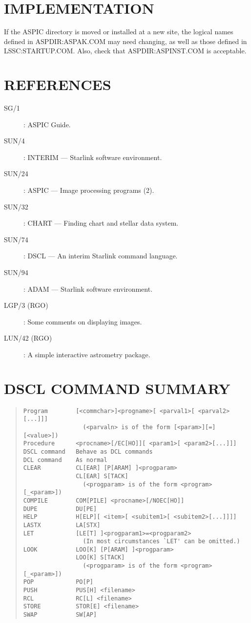 \section {IMPLEMENTATION}

If the ASPIC directory is moved or installed at a new site, the logical names
defined in ASPDIR:ASPAK.COM may need changing, as well as those defined in
LSSC:STARTUP.COM.
Also, check that ASPDIR:ASPINST.COM is acceptable.

\section {REFERENCES}

\begin{description}
\item [SG/1]: ASPIC Guide.
\item [SUN/4]: INTERIM --- Starlink software environment.
\item [SUN/24]: ASPIC --- Image processing programs (2).
\item [SUN/32]: CHART --- Finding chart and stellar data system.
\item [SUN/74]: DSCL --- An interim Starlink command language.
\item [SUN/94]: ADAM --- Starlink software environment.
\item [LGP/3 (RGO)]: Some comments on displaying images.
\item [LUN/42 (RGO)]: A simple interactive astrometry package.
\end{description}
\appendix

\section {DSCL COMMAND SUMMARY}

\begin{quote}
\begin{verbatim}
Program        [<commchar>]<progname>[ <parval1>[ <parval2>[...]]]
                 (<parvaln> is of the form [<param>][=][<value>])
Procedure      <procname>[/EC[HO]][ <param1>[ <param2>[...]]]
DSCL command   Behave as DCL commands
DCL command    As normal
CLEAR          CL[EAR] [P[ARAM] ]<progparam>
               CL[EAR] S[TACK]
                 (<progparam> is of the form <program>[_<param>])
COMPILE        COM[PILE] <procname>[/NOEC[HO]]
DUPE           DU[PE]
HELP           H[ELP][ <item>[ <subitem1>[ <subitem2>[...]]]]
LASTX          LA[STX]
LET            [LE[T] ]<progparam1>=<progparam2>
                 (In most circumstances `LET' can be omitted.)
LOOK           LOO[K] [P[ARAM] ]<progparam>
               LOO[K] S[TACK]
                 (<progparam> is of the form <program>[_<param>])
POP            PO[P]
PUSH           PUS[H] <filename>
RCL            RC[L] <filename>
STORE          STOR[E] <filename>
SWAP           SW[AP]
\end{verbatim}
\end{quote}
\newpage


